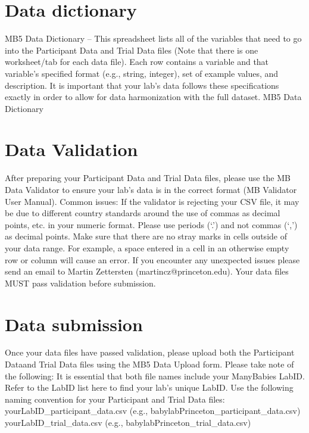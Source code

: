 \documentclass[
  letterpaper,
  DIV=11,
  numbers=noendperiod,
  oneside]{scrreprt}
\begin{document}
\section*{Data dictionary}\label{data-dictionary}


MB5 Data Dictionary -- This spreadsheet lists all of the variables that
need to go into the Participant Data and Trial Data files (Note that
there is one worksheet/tab for each data file). Each row contains a
variable and that variable's specified format (e.g., string, integer),
set of example values, and description. It is important that your lab's
data follows these specifications exactly in order to allow for data
harmonization with the full dataset. MB5 Data Dictionary

\section*{Data Validation}\label{data-validation}


After preparing your Participant Data and Trial Data files, please use
the MB Data Validator to ensure your lab's data is in the correct format
(MB Validator User Manual). Common issues: If the validator is rejecting
your CSV file, it may be due to different country standards around the
use of commas as decimal points, etc. in your numeric format. Please use
periods (`.') and not commas (`,') as decimal points. Make sure that
there are no stray marks in cells outside of your data range. For
example, a space entered in a cell in an otherwise empty row or column
will cause an error. If you encounter any unexpected issues please send
an email to Martin Zettersten (martincz@princeton.edu). Your data files
MUST pass validation before submission.

\section*{Data submission}\label{data-submission}


Once your data files have passed validation, please upload both the
Participant Dataand Trial Data files using the MB5 Data Upload form.
Please take note of the following: It is essential that both file names
include your ManyBabies LabID. Refer to the LabID list here to find your
lab's unique LabID. Use the following naming convention for your
Participant and Trial Data files: yourLabID\_participant\_data.csv
(e.g., babylabPrinceton\_participant\_data.csv)
yourLabID\_trial\_data.csv (e.g., babylabPrinceton\_trial\_data.csv)
\end{document}
